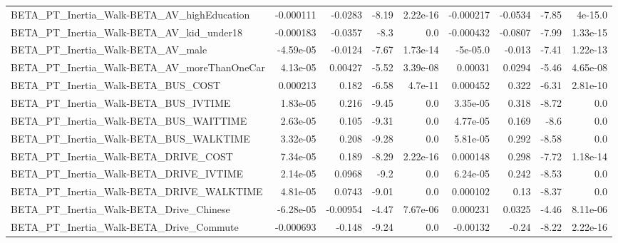 \begin{tabular}{lrrrrrrrr}
BETA\_PT\_Inertia\_Walk-BETA\_AV\_highEducation         &   -0.000111 &      -0.0283 &    -8.19 & 2.22e-16 &  -0.000217 &     -0.0534 &        -7.85 &       4e-15.0 \\
BETA\_PT\_Inertia\_Walk-BETA\_AV\_kid\_under18           &   -0.000183 &      -0.0357 &     -8.3 &      0.0 &  -0.000432 &     -0.0807 &        -7.99 &      1.33e-15 \\
BETA\_PT\_Inertia\_Walk-BETA\_AV\_male                  &   -4.59e-05 &      -0.0124 &    -7.67 & 1.73e-14 &   -5e-05.0 &      -0.013 &        -7.41 &      1.22e-13 \\
BETA\_PT\_Inertia\_Walk-BETA\_AV\_moreThanOneCar        &    4.13e-05 &      0.00427 &    -5.52 & 3.39e-08 &    0.00031 &      0.0294 &        -5.46 &      4.65e-08 \\
BETA\_PT\_Inertia\_Walk-BETA\_BUS\_COST                 &    0.000213 &        0.182 &    -6.58 &  4.7e-11 &   0.000452 &       0.322 &        -6.31 &      2.81e-10 \\
BETA\_PT\_Inertia\_Walk-BETA\_BUS\_IVTIME               &    1.83e-05 &        0.216 &    -9.45 &      0.0 &   3.35e-05 &       0.318 &        -8.72 &           0.0 \\
BETA\_PT\_Inertia\_Walk-BETA\_BUS\_WAITTIME             &    2.63e-05 &        0.105 &    -9.31 &      0.0 &   4.77e-05 &       0.169 &         -8.6 &           0.0 \\
BETA\_PT\_Inertia\_Walk-BETA\_BUS\_WALKTIME             &    3.32e-05 &        0.208 &    -9.28 &      0.0 &   5.81e-05 &       0.292 &        -8.58 &           0.0 \\
BETA\_PT\_Inertia\_Walk-BETA\_DRIVE\_COST               &    7.34e-05 &        0.189 &    -8.29 & 2.22e-16 &   0.000148 &       0.298 &        -7.72 &      1.18e-14 \\
BETA\_PT\_Inertia\_Walk-BETA\_DRIVE\_IVTIME             &    2.14e-05 &       0.0968 &     -9.2 &      0.0 &   6.24e-05 &       0.242 &        -8.53 &           0.0 \\
BETA\_PT\_Inertia\_Walk-BETA\_DRIVE\_WALKTIME           &    4.81e-05 &       0.0743 &    -9.01 &      0.0 &   0.000102 &        0.13 &        -8.37 &           0.0 \\
BETA\_PT\_Inertia\_Walk-BETA\_Drive\_Chinese            &   -6.28e-05 &     -0.00954 &    -4.47 & 7.67e-06 &   0.000231 &      0.0325 &        -4.46 &      8.11e-06 \\
BETA\_PT\_Inertia\_Walk-BETA\_Drive\_Commute            &   -0.000693 &       -0.148 &    -9.24 &      0.0 &   -0.00132 &       -0.24 &        -8.22 &      2.22e-16 \\

\end{tabular}
